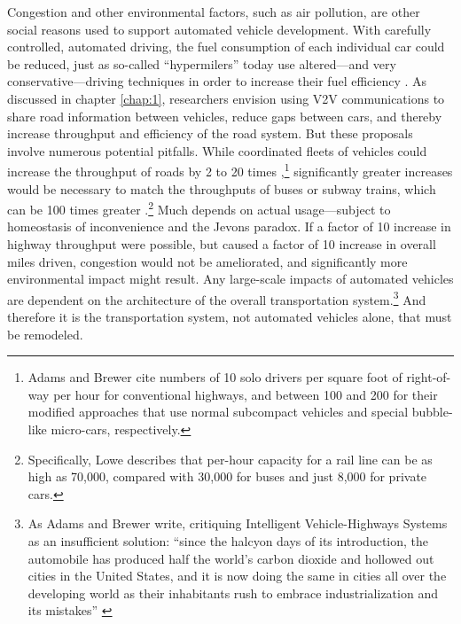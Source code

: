 Congestion and other environmental factors, such as air pollution, are
other social reasons used to support automated vehicle development.
With carefully controlled, automated driving, the fuel consumption of each
individual car could be reduced, just as so-called ``hypermilers''
today use altered---and very conservative---driving techniques in
order to increase their fuel efficiency \cite{orourkeHypermile}. As discussed in
chapter \ref{chap:1}, researchers envision using V2V communications to
share road information between vehicles, reduce gaps between cars, and
thereby increase throughput and efficiency of the road system. But
these proposals involve numerous potential pitfalls. While coordinated
fleets of vehicles could increase the throughput of roads by 2 to 20
times \cite[p. 229]{adamsBrewerRoadways},\footnote{Adams and Brewer
  cite numbers of 10 solo drivers per square foot of right-of-way per
  hour for conventional highways, and between 100 and 200 for their
  modified approaches that use normal subcompact vehicles and special
  bubble-like micro-cars, respectively.} significantly greater increases would be necessary to match the
throughputs of buses or subway trains, which can be 100 times
greater \cite[p. 222]{loweCars}.\footnote{Specifically, Lowe describes that
  per-hour capacity for 
  a rail line can be as high as 70,000, compared with 30,000 for buses
and just 8,000 for private cars.} Much depends on actual usage---subject to
homeostasis of inconvenience and the Jevons paradox. If a factor of 10
increase in highway throughput were possible, but caused a factor of
10 increase in overall miles driven, congestion would not be
ameliorated, and significantly more environmental impact might result. Any
large-scale impacts of automated vehicles are dependent on the
architecture of the overall transportation system.\footnote{As Adams
  and Brewer write, critiquing Intelligent Vehicle-Highways Systems as
  an insufficient solution: ``since the halcyon days of its introduction, the
  automobile has produced half the world's carbon dioxide and hollowed
out cities in the United States, and it is now doing the same in
cities all over the developing world as their inhabitants rush to
embrace industrialization and its mistakes'' \cite[p.
  227]{adamsBrewerRoadways}} And therefore it is
the transportation system, not automated vehicles alone, that must be remodeled.

